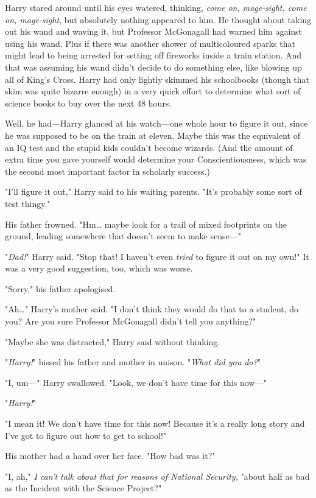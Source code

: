 Harry stared around until his eyes watered, thinking, \emph{come on, 
mage-sight, come on, mage-sight}, but absolutely nothing appeared to him. He 
thought about taking out his wand and waving it, but Professor McGonagall had 
warned him against using his wand. Plus if there was another shower of 
multicoloured sparks that might lead to being arrested for setting off 
fireworks inside a train station. And that was assuming his wand didn't decide 
to do something else, like blowing up all of King's Cross. Harry had only 
lightly skimmed his schoolbooks (though that skim was quite bizarre enough) in 
a very quick effort to determine what sort of science books to buy over the 
next 48 hours.

Well, he had---Harry glanced at his watch---one whole hour to figure it out, 
since he was supposed to be on the train at eleven. Maybe this was the 
equivalent of an IQ test and the stupid kids couldn't become wizards. (And the 
amount of extra time you gave yourself would determine your Conscientiousness, 
which was the second most important factor in scholarly success.)

"I'll figure it out," Harry said to his waiting parents. "It's probably some 
sort of test thingy."

His father frowned. "Hm{\ldots} maybe look for a trail of mixed footprints on 
the ground, leading somewhere that doesn't seem to make sense---"

"\emph{Dad!}" Harry said. "Stop that! I haven't even \emph{tried} to figure it 
out on my own!" It was a very good suggestion, too, which was worse.

"Sorry," his father apologised.

"Ah{\ldots}" Harry's mother said. "I don't think they would do that to a 
student, do you? Are you sure Professor McGonagall didn't tell you anything?"

"Maybe she was distracted," Harry said without thinking.

"\emph{Harry!}" hissed his father and mother in unison. "\emph{What did you 
do?}"

"I, um---" Harry swallowed. "Look, we don't have time for this now---"

"\emph{Harry!}"

"I mean it! We don't have time for this now! Because it's a really long story 
and I've got to figure out how to get to school!"

His mother had a hand over her face. "How bad was it?"

"I, ah," \emph{I can't talk about that for reasons of National Security,} 
"about half as bad as the Incident with the Science Project?"


